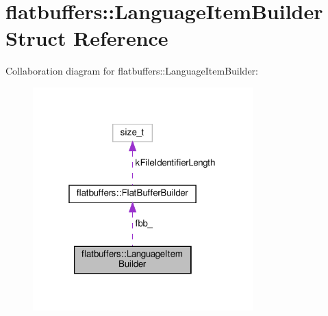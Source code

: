 \hypertarget{structflatbuffers_1_1LanguageItemBuilder}{}\section{flatbuffers\+:\+:Language\+Item\+Builder Struct Reference}
\label{structflatbuffers_1_1LanguageItemBuilder}


Collaboration diagram for flatbuffers\+:\+:Language\+Item\+Builder\+:
\nopagebreak
\begin{figure}[H]
\begin{center}
\leavevmode
\includegraphics[width=241pt]{structflatbuffers_1_1LanguageItemBuilder__coll__graph}
\end{center}
\end{figure}
